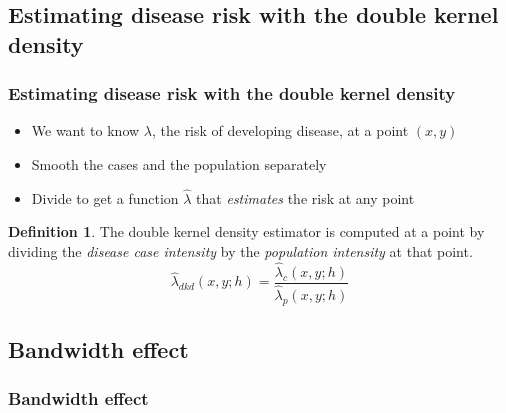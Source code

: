 \documentclass[notheorems]{beamer}
\theoremstyle{definition}
\newtheorem{definition}{Definition}
\theoremstyle{example}
\begin{document}
\subsection{Estimating disease risk with the double kernel density}
\begin{frame}\frametitle{Estimating disease risk with the double kernel density}
    \begin{itemize}
        \item We want to know $\lambda$, the risk of developing disease, at a point $(x,y)$
        \item Smooth the cases and the population separately
        \item Divide to get a function \textbf{$\hat{\lambda}$} that \emph{estimates} the risk at any point
    \end{itemize}
    \begin{definition}
        The \alert{double kernel density} estimator is computed at a point by dividing the \emph{disease case intensity} by the \emph{population intensity} at that point.
        \begin{equation*}
            \hat{\lambda}_{dkd}(x,y;h) = \frac{ \hat{\lambda}_{c}(x,y;h) } { \hat{\lambda}_{p}(x,y;h) }
        \end{equation*}
    \end{definition}
\end{frame}

\subsection{Bandwidth effect}
\begin{frame}\frametitle{Bandwidth effect}
\end{frame}


\end{document}

